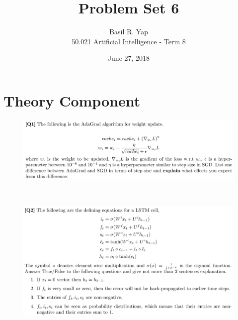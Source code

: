 \documentclass[12pt]{article}
\newenvironment{solution}[2][Solution]{\begin{trivlist}
\item[\hskip \labelsep {\bfseries #1}]}{\end{trivlist}}
\begin{document}
 
 
\title{Problem Set 6}%
\author{Basil R. Yap\\ %
50.021 Artificial Intelligence - Term 8} %
\date{June 27, 2018}
\maketitle

\section{Theory Component}
\begin{figure}[h!]
\includegraphics[width=\linewidth]{./assets/201606300427.png}
\end{figure}

\begin{solution}{}~

\end{solution}

\begin{figure}[h!]
\includegraphics[width=\linewidth]{./assets/201606300428.png}
\end{figure}
\end{document}
